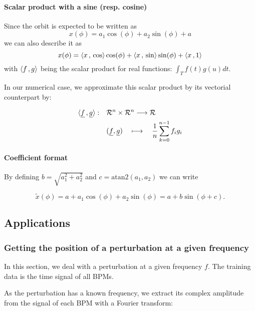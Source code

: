 \paragraph{Scalar product with a sine (resp. cosine)}
Since the orbit is expected to be written as
\begin{equation*}
x(\phi) = a_1 \cos(\phi) + a_2 \sin(\phi) + a
\end{equation*}
we can also describe it as
\begin{equation}
x(\phi) = \langle x {\,,\,} \cos \rangle \cos(\phi) + \langle x {\,,\,} \sin \rangle \sin(\phi) + \langle x {\,,\,} 1 \rangle
\end{equation}
with $\langle f {\,,\,} g \rangle$ being the scalar product for real functions: $\int_T f(t)g(u)dt$.

In our numerical case, we approximate this scalar product by its vectorial counterpart by:

\begin{align*}
\langle \underline{f} {\,,\,} \underline{g} \rangle: \quad
 &\mathcal{R}^n \times \mathcal{R}^n \longrightarrow \mathcal{R} \\
 & (\underline{f},\underline{g}) \quad\longmapsto \quad \frac{1}{n}\sum\limits_{k=0}^{n-1} f_i g_i
\end{align*}

\paragraph{Coefficient format}
By defining $b = \sqrt{a_1^2+a_2^2}$ and $c = \mathrm{atan2}(a_1, a_2)$  we can write

\begin{equation*}
\tilde{x}(\phi) = a + a_1 \cos(\phi) + a_2 \sin(\phi) = a + b \sin(\phi + c).
\end{equation*} 

\subsection{Applications}
\subsubsection{Getting the position of a perturbation at a given frequency}
In this section, we deal with a perturbation at a given frequency $f$. The training data is the time signal of all BPMs.

As the perturbation has a known frequency, we extract its complex amplitude from the signal of each BPM with a Fourier transform:

